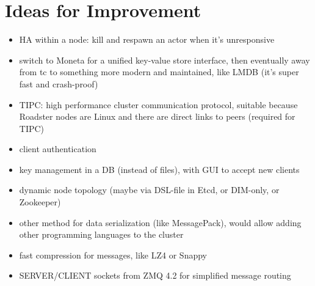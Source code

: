 \section{Ideas for Improvement}
\begin{itemize}
	\item HA within a node: kill and respawn an actor when it's unresponsive
	\item switch to Moneta for a unified key-value store interface, then eventually away from \gls{tc} to something more modern and maintained, like LMDB (it's super fast and crash-proof)
	\item TIPC: high performance cluster communication protocol, suitable because Roadster nodes are Linux and there are direct links to peers (required for TIPC)
	\item client authentication
	\item key management in a DB (instead of files), with GUI to accept new clients
	\item dynamic node topology (maybe via DSL-file in Etcd, or DIM-only, or Zookeeper)
	\item other method for data serialization (like MessagePack), would allow adding other programming languages to the cluster
	\item fast compression for messages, like LZ4 or Snappy
	\item SERVER/CLIENT sockets from ZMQ 4.2 for simplified message routing
\end{itemize}
